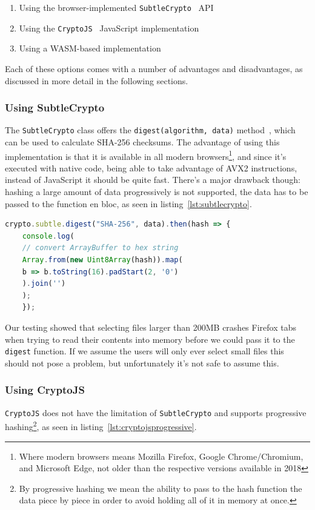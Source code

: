 \begin{enumerate}
    \item Using the browser-implemented \texttt{SubtleCrypto}~\cite{subtlecrypto} \gls{API}
    \item Using the \texttt{CryptoJS}~\cite{cryptojs} JavaScript implementation
    \item Using a \gls{WASM}-based implementation
\end{enumerate}

Each of these options comes with a number of advantages and disadvantages, as discussed in more detail in the following sections.

\subsubsection{Using SubtleCrypto}
\label{subsubsec:subtlecrypto}
The \texttt{SubtleCrypto} class offers the \texttt{digest(algorithm, data)} method~\cite{subtlecrypto}, which can be used to
calculate \gls{SHA-256} checksums.
The advantage of using this implementation is that it is available in all modern browsers\footnote{Where modern browsers means Mozilla Firefox, Google Chrome/Chromium, and Microsoft Edge, not older than the respective versions available in 2018},
and since it's executed with native code, being able to take advantage of \gls{AVX2} instructions, instead of JavaScript it should be quite fast.
There's a major drawback though: hashing a large amount of data progressively is not supported, the data has to be
passed to the function en bloc, as seen in listing~\ref{lst:subtlecrypto}.

\begin{lstlisting}[caption={Using SubtleCrypto for calculating SHA-256 checksums}, captionpos=b, language=JavaScript, label={lst:subtlecrypto}]
    crypto.subtle.digest("SHA-256", data).then(hash => {
    console.log(
    // convert ArrayBuffer to hex string
    Array.from(new Uint8Array(hash)).map(
    b => b.toString(16).padStart(2, '0')
    ).join('')
    );
    });
\end{lstlisting}
Our testing showed that selecting files larger than 200MB crashes Firefox tabs when trying to read their contents
into memory before we could pass it to the \texttt{digest} function.
If we assume the users will only ever select small files this should not pose a problem, but unfortunately it's not safe to assume this.

\subsubsection{Using CryptoJS}
\label{subsubsec:cryptojs}
\texttt{CryptoJS} does not have the limitation of \texttt{SubtleCrypto} and supports progressive hashing\footnote{
By progressive hashing we mean the ability to pass to the hash function the data piece by piece in order to avoid holding all of it in memory at once.},
as seen in listing~\ref{lst:cryptojsprogressive}.


